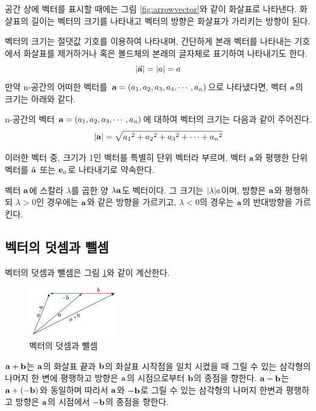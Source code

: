 \documentclass[a4paper,twoside,11pt]{book}
\begin{document}
공간 상에 벡터를 표시할 때에는 그림 \ref{fig:arrowvector}와 같이 화살표로 나타낸다. 화살표의 길이는 벡터의 크기를 나타내고 벡터의 방향은 화살표가 가리키는 방향이 된다.

벡터의 크기는 절댓값 기호를 이용하여 나타내며, 간단하게 본래 벡터를 나타내는 기호에서 화살표를 제거하거나 혹은 볼드체의 본래의 글자체로 표기하여 나타내기도 한다.
$$\abs{\va{a}} = \abs{a} = a $$
만약 n-공간의 어떠한 벡터를 $\vb{a} = (a_1, a_2, a_3, a_4, \cdots, a_n)$으로 나타냈다면, 벡터 $\vb{a}$의 크기는 아래와 같다.

\begin{keypoint}
  n-공간의 벡터 $\vb{a} = (a_1, a_2, a_3, \cdots, a_n)$에 대하여 벡터의 크기는 다음과 같이 주어진다.
  $$\abs{\vb{a}} = \sqrt{{a_1}^2 + {a_2}^2 + {a_3}^2 + \cdots + {a_n}^2 }$$
\end{keypoint}

이러한 벡터 중, 크기가 1인 벡터를 특별히 단위 벡터라 부르며, 벡터 $\vb{a}$와 평행한 단위 벡터를 $\vu{a}$ 또는 $\vb{e}_a$로 나타내기로 약속한다.

벡터 $\vb{a}$에 스칼라 $\lambda$를 곱한 양 $\lambda\vb{a}$도 벡터이다. 그 크기는 $\abs{\lambda}a$이며, 방향은 $\vb{a}$와 평행하되 $\lambda>0$인 경우에는 $\vb{a}$와 같은 방향을 가르키고, $\lambda<0$의 경우는 $\vb{a}$의 반대방향을 가르킨다.

\subsection{벡터의 덧셈과 뺄셈}

벡터의 덧셈과 뺄셈은 그림 \ref{fig:addsubvector}와 같이 계산한다.

\begin{figure}
  \centering
  \includegraphics[width=0.34\textwidth]{images/fig1-2}
  \caption{벡터의 덧셈과 뺄셈}
  \label{fig:addsubvector}
\end{figure}

$\vb{a} + \vb{b}$는 $\vb{a}$의 화살표 끝과 $\vb{b}$의 화살표 시작점을 일치 시켰을 때 그릴 수 있는 삼각형의 나머지 한 변에 평행하고 방향은 $\vb{a}$의 시점으로부터 $\vb{b}$의 종점을 향한다. $\vb{a} - \vb{b}$는 $\vb{a} + (-\vb{b})$와 동일하며 따라서 $\vb{a}$와 $-\vb{b}$로 그릴 수 있는 삼각형의 나머지 한변과 평행하고 방향은 $\vb{a}$의 시점에서 $-\vb{b}$의 종점을 향한다.
\end{document}
